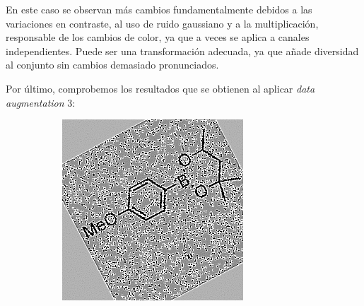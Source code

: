 En este caso se observan más cambios fundamentalmente debidos a las variaciones en contraste, al uso de ruido gaussiano y a la multiplicación, responsable de los cambios de color, ya que a veces se aplica a canales independientes. Puede ser una transformación adecuada, ya que añade diversidad al conjunto sin cambios demasiado pronunciados. 

Por último, comprobemos los resultados que se obtienen al aplicar \textit{data augmentation} 3:

\begin{figure}[H]
\centering
    \begin{subfigure}{.28\textwidth}
        \centering
        \includegraphics[width=1\linewidth]{imagenes/aug3/175.jpg}
    \end{subfigure}%
    \begin{subfigure}{.28\textwidth}
        \centering

\end{subfigure}
\end{figure}
